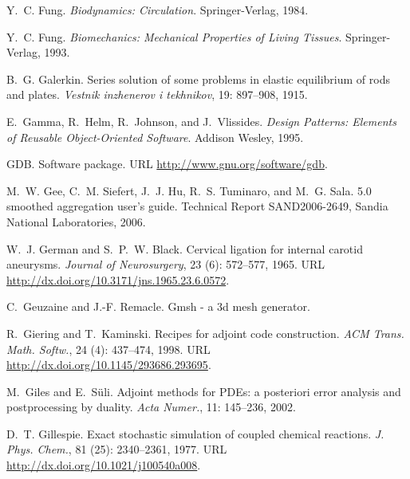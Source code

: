 \begin{thebibliography}{467}
Y.~C. Fung.
\newblock \emph{Biodynamics: Circulation}.
\newblock Springer-Verlag, 1984.

Y.~C. Fung.
\newblock \emph{Biomechanics: Mechanical Properties of Living Tissues}.
\newblock Springer-Verlag, 1993.

B.~G. Galerkin.
\newblock Series solution of some problems in elastic equilibrium of rods and
  plates.
\newblock \emph{Vestnik inzhenerov i tekhnikov}, 19: 897--908, 1915.

E.~Gamma, R.~Helm, R.~Johnson, and J.~Vlissides.
\newblock \emph{Design Patterns: Elements of Reusable Object-Oriented
  Software}.
\newblock Addison Wesley, 1995.

GDB.
\newblock Software package.
\newblock URL \url{http://www.gnu.org/software/gdb}.

M.~W. Gee, C.~M. Siefert, J.~J. Hu, R.~S. Tuminaro, and M.~G. Sala.
 5.0 smoothed aggregation user's guide.
\newblock Technical Report SAND2006-2649, Sandia National Laboratories, 2006.

W.~J. German and S.~P.~W. Black.
\newblock Cervical ligation for internal carotid aneurysms.
\newblock \emph{Journal of Neurosurgery}, 23 (6): 572--577,
  1965.
\newblock URL \url{http://dx.doi.org/10.3171/jns.1965.23.6.0572}.

C.~Geuzaine and J.-F. Remacle.
\newblock Gmsh - a 3d mesh generator.

R.~Giering and T.~Kaminski.
\newblock Recipes for adjoint code construction.
\newblock \emph{ACM Trans. Math. Softw.}, 24 (4): 437--474,
  1998.
\newblock URL \url{http://dx.doi.org/10.1145/293686.293695}.

M.~Giles and E.~S{\" u}li.
\newblock Adjoint methods for {PDE}s: a posteriori error analysis and
  postprocessing by duality.
\newblock \emph{Acta Numer.}, 11: 145--236, 2002.

D.~T. Gillespie.
\newblock Exact stochastic simulation of coupled chemical reactions.
\newblock \emph{J. Phys. Chem.}, 81 (25): 2340--2361, 1977.
\newblock URL \url{http://dx.doi.org/10.1021/j100540a008}.


\end{thebibliography}

